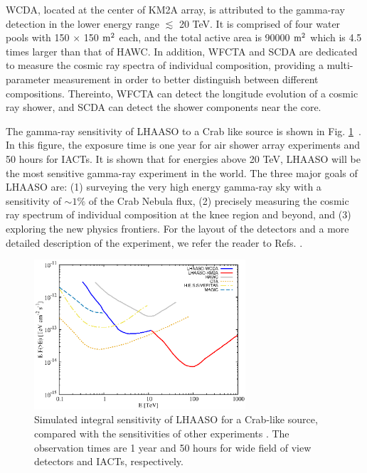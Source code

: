 \documentclass[12pt,aps,prd,amsmath,amssymb,showpacs,floats,floatfix,nofootinbib]{revtex4-1}
\begin{document}
WCDA, located at the center of KM2A array, is attributed to the gamma-ray detection in the lower energy range $\lesssim$ 20 TeV. It is comprised of four water pools with 150 $\times$ 150 $\rm m^{2}$ each, and the total active area is 90000 $\rm m^{2}$ which is 4.5 times larger than that of HAWC. In addition, WFCTA and SCDA are dedicated to measure the cosmic ray spectra of individual composition, providing a multi-parameter measurement in order to better distinguish between different compositions. Thereinto, WFCTA can detect the longitude evolution of a cosmic ray shower, and SCDA can detect the shower components near the core.

The gamma-ray sensitivity of LHAASO to a Crab like source is shown in Fig. \ref{fig:integral-sensi}~\cite{Cao:2014rla}. In this figure, the exposure time is one year for air shower array experiments and 50 hours for IACTs. It is shown that for energies above 20 TeV, LHAASO will be the most sensitive gamma-ray experiment in the world. The three major goals of LHAASO are: (1) surveying the very high energy gamma-ray sky with a sensitivity of $\sim1\%$ of the Crab Nebula flux, (2) precisely measuring the cosmic ray spectrum of individual composition at the knee region and beyond, and (3) exploring the new physics frontiers. For the layout of the detectors and a more detailed description of the experiment, we refer the reader to Refs. \cite{Cao:2010zz,Cao:2014rla}.

\begin{figure}
\includegraphics[width=0.70\textwidth]{sensitivity.eps}
\caption{Simulated integral sensitivity of LHAASO for a Crab-like source, compared with the sensitivities of other experiments \cite{Acharya:2013sxa,Cao:2014rla}. The observation times are 1 year and 50 hours for wide field of view detectors and IACTs, respectively.}
\label{fig:integral-sensi}
\end{figure}
\end{document}
